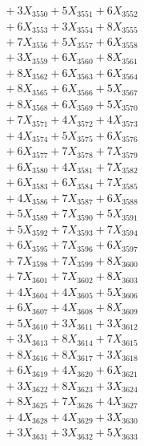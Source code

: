 \documentclass[a4paper,10pt]{article}
\begin{document}
{\begin{align}
&\;  + 3 X_{3550} + 5 X_{3551} + 6 X_{3552} \\[0.3ex]
&\;  + 6 X_{3553} + 3 X_{3554} + 8 X_{3555} \\[0.3ex]
&\;  + 7 X_{3556} + 5 X_{3557} + 6 X_{3558} \\[0.3ex]
&\;  + 3 X_{3559} + 6 X_{3560} + 8 X_{3561} \\[0.3ex]
&\;  + 8 X_{3562} + 6 X_{3563} + 6 X_{3564} \\[0.3ex]
&\;  + 8 X_{3565} + 6 X_{3566} + 5 X_{3567} \\[0.3ex]
&\;  + 8 X_{3568} + 6 X_{3569} + 5 X_{3570} \\[0.3ex]
&\;  + 7 X_{3571} + 4 X_{3572} + 4 X_{3573} \\[0.3ex]
&\;  + 4 X_{3574} + 5 X_{3575} + 6 X_{3576} \\[0.3ex]
&\;  + 6 X_{3577} + 7 X_{3578} + 7 X_{3579} \\[0.5ex]\allowbreak
&\;  + 6 X_{3580} + 4 X_{3581} + 7 X_{3582} \\[0.3ex]
&\;  + 6 X_{3583} + 6 X_{3584} + 7 X_{3585} \\[0.3ex]
&\;  + 4 X_{3586} + 7 X_{3587} + 6 X_{3588} \\[0.3ex]
&\;  + 5 X_{3589} + 7 X_{3590} + 5 X_{3591} \\[0.3ex]
&\;  + 5 X_{3592} + 7 X_{3593} + 7 X_{3594} \\[0.3ex]
&\;  + 6 X_{3595} + 7 X_{3596} + 6 X_{3597} \\[0.3ex]
&\;  + 7 X_{3598} + 7 X_{3599} + 8 X_{3600} \\[0.3ex]
&\;  + 7 X_{3601} + 7 X_{3602} + 8 X_{3603} \\[0.3ex]
&\;  + 4 X_{3604} + 4 X_{3605} + 5 X_{3606} \\[0.3ex]
&\;  + 6 X_{3607} + 4 X_{3608} + 8 X_{3609} \\[0.5ex]\allowbreak
&\;  + 5 X_{3610} + 3 X_{3611} + 3 X_{3612} \\[0.3ex]
&\;  + 3 X_{3613} + 8 X_{3614} + 7 X_{3615} \\[0.3ex]
&\;  + 8 X_{3616} + 8 X_{3617} + 3 X_{3618} \\[0.3ex]
&\;  + 6 X_{3619} + 4 X_{3620} + 6 X_{3621} \\[0.3ex]
&\;  + 3 X_{3622} + 8 X_{3623} + 3 X_{3624} \\[0.3ex]
&\;  + 8 X_{3625} + 7 X_{3626} + 4 X_{3627} \\[0.3ex]
&\;  + 4 X_{3628} + 4 X_{3629} + 3 X_{3630} \\[0.3ex]
&\;  + 3 X_{3631} + 3 X_{3632} + 5 X_{3633} \\[0.3ex]

\end{align}}
\end{document}
